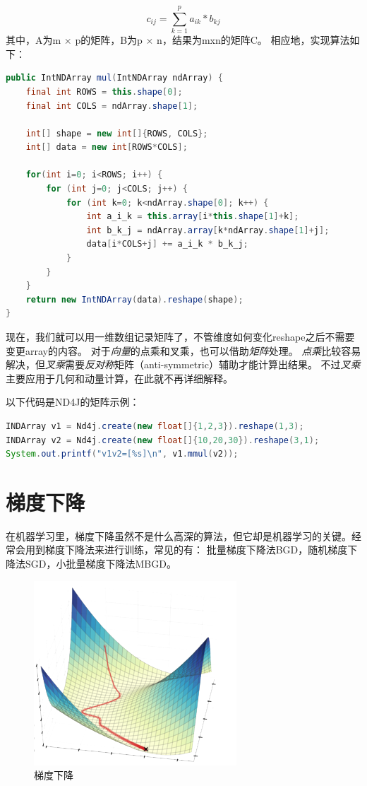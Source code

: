 \begin{equation}
c_{ij}= \sum_{k=1}^pa_{ik}*b_{kj}
\end{equation}
其中，A为m $\times$ p的矩阵，B为p $\times$ n，结果为mxn的矩阵C。
相应地，实现算法如下：

\begin{lstlisting}[language=Java,caption={矩阵乘法}]
public IntNDArray mul(IntNDArray ndArray) {
    final int ROWS = this.shape[0];
    final int COLS = ndArray.shape[1];

    int[] shape = new int[]{ROWS, COLS};
    int[] data = new int[ROWS*COLS];

    for(int i=0; i<ROWS; i++) {
        for (int j=0; j<COLS; j++) {
            for (int k=0; k<ndArray.shape[0]; k++) {
                int a_i_k = this.array[i*this.shape[1]+k];
                int b_k_j = ndArray.array[k*ndArray.shape[1]+j];
                data[i*COLS+j] += a_i_k * b_k_j;
            }
        }
    }
    return new IntNDArray(data).reshape(shape);
}
\end{lstlisting}

现在，我们就可以用一维数组记录矩阵了，不管维度如何变化reshape之后不需要变更array的内容。
对于\emph{向量}的点乘和叉乘，也可以借助\emph{矩阵}处理。
\emph{点乘}比较容易解决，但\emph{叉乘}需要\emph{反对称}矩阵（anti-symmetric）辅助才能计算出结果。
不过\emph{叉乘}主要应用于几何和动量计算，在此就不再详细解释。

\vspace{0.3cm}\noindent
以下代码是ND4J的矩阵示例：
\begin{lstlisting}[language=Java]
INDArray v1 = Nd4j.create(new float[]{1,2,3}).reshape(1,3);
INDArray v2 = Nd4j.create(new float[]{10,20,30}).reshape(3,1);
System.out.printf("v1v2=[%s]\n", v1.mmul(v2));
\end{lstlisting}


\section{梯度下降}
在机器学习里，梯度下降虽然不是什么高深的算法，但它却是机器学习的关键。经常会用到梯度下降法来进行训练，常见的有：
批量梯度下降法BGD，随机梯度下降法SGD，小批量梯度下降法MBGD。

\begin{figure}[!htb]
\centerline{\includegraphics[width=.2\figwidth]{images/sgd.png}}
\label{fig:part2_math_sgd}
\caption{梯度下降}
\end{figure}

